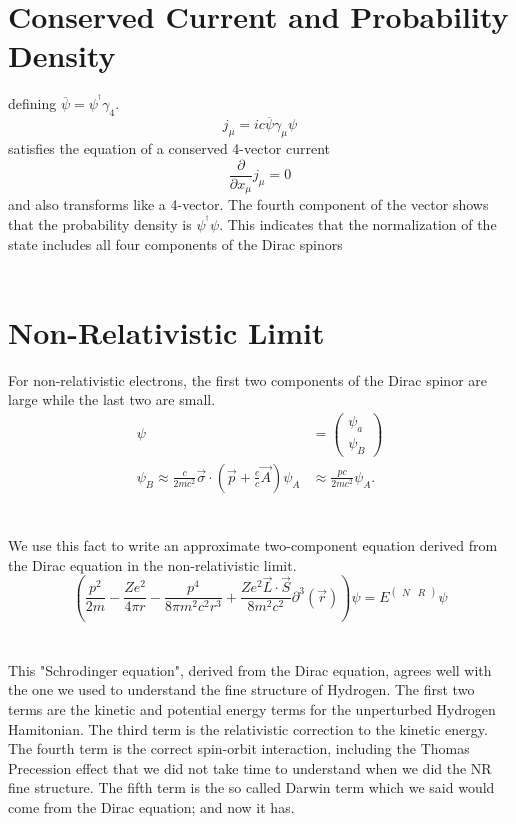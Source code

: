 \documentclass{report}
\begin{document}
\section{Conserved Current and Probability Density}
defining $\displaystyle \overline{\psi} = \psi^{^{\dagger}}\gamma_4$.
\begin{equation}
	j_{\mu} = i c \overline{\psi}\gamma_{\mu}\psi
\end{equation}
satisfies the equation of a conserved 4-vector current
\begin{equation}
	\frac{ \partial }{ \partial x_{\mu} } j_{\mu} = 0
\end{equation}
and also transforms like a 4-vector. The fourth component of the vector shows that the probability density is $\displaystyle \psi^{^{\dagger}}\psi$. This indicates that the normalization of the state includes all four components of the Dirac spinors \\ \\

\section{Non-Relativistic Limit}
For non-relativistic electrons, the first two components of the Dirac spinor are large while the last two are small.
\begin{align*}
	\psi                                                                                                    & = \begin{pmatrix} \psi_{a} \\ \psi_{B} \end{pmatrix} \\
	\psi_{B} \approx \frac{c}{2mc^2}\vec{\sigma} \cdot \left( \vec{p} + \frac{e}{c}\vec{A} \right) \psi_{A} & \approx \frac{pc}{2mc^2}\psi_{A}
	.\end{align*}\\ \\
We use this fact to write an approximate two-component equation derived from the Dirac equation in the non-relativistic limit.
\begin{equation}
	\left( \frac{p^2}{2m} - \frac{Ze^2}{4\pi r} - \frac{p^{4}}{8\pi m^2 c^2 r^3} + \frac{Z e^2 \vec{L} \cdot \vec{S}}{8m^2 c^2} \partial^3 (\vec{r}) \right) \psi = E^{\begin{pmatrix} N & R \end{pmatrix} } \psi
\end{equation}\\ \\
This "Schrodinger equation", derived from the Dirac equation, agrees well with the one we used to understand the fine structure of Hydrogen. The first two terms are the kinetic and potential energy terms for the unperturbed Hydrogen Hamitonian. The third term is the relativistic correction to the kinetic energy. The fourth term is the correct spin-orbit interaction, including the Thomas Precession effect that we did not take time to understand when we did the NR fine structure. The fifth term is the so called Darwin term which we said would come from the Dirac equation; and now it has. \\ \\
\end{document}
